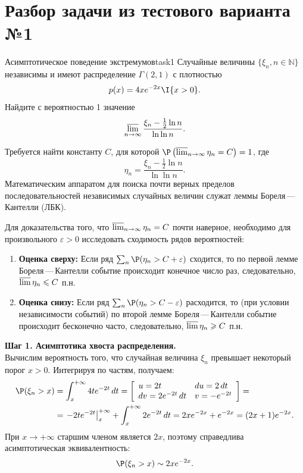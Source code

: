 \section*{Разбор задачи из тестового варианта №1}
\begin{Task}{Асимптотическое поведение экстремумов}{task1}
Случайные величины $\{\xi_n, n \in \mathbb{N}\}$ независимы и имеют распределение $\Gamma(2, 1)$ с плотностью
\[
p(x) = 4xe^{-2x}\I\{x > 0\}.
\]
Найдите с вероятностью 1 значение
\[
\varlimsup_{n \to \infty} \frac{\xi_n - \frac{1}{2}\ln n}{\ln \ln n}.
\]
\end{Task}

\begin{Solution}
Требуется найти константу $C$, для которой $\P\left(\varlimsup_{n\to\infty} \eta_n = C\right) = 1$, где 
\[
\eta_n = \frac{\xi_n - \frac{1}{2}\ln n}{\ln \ln n}.
\]
Математическим аппаратом для поиска почти верных пределов последовательностей независимых случайных величин служат леммы Бореля\,---\,Кантелли (ЛБК). 

\begin{MethodBox}
Для доказательства того, что $\varlimsup_{n\to\infty} \eta_n = C$ почти наверное, необходимо для произвольного $\varepsilon > 0$ исследовать сходимость рядов вероятностей:
\begin{enumerate}
    \item \textbf{Оценка сверху:} Если ряд $\sum_{n} \P(\eta_n > C + \varepsilon)$ сходится, то по первой лемме Бореля\,---\,Кантелли событие происходит конечное число раз, следовательно, $\varlimsup \eta_n \leqslant C$ п.н.
    \item \textbf{Оценка снизу:} Если ряд $\sum_{n} \P(\eta_n > C - \varepsilon)$ расходится, то (при условии независимости событий) по второй лемме Бореля\,---\,Кантелли событие происходит бесконечно часто, следовательно, $\varlimsup \eta_n \geqslant C$ п.н.
\end{enumerate}
\end{MethodBox}

\textbf{Шаг 1. Асимптотика хвоста распределения.} \\
Вычислим вероятность того, что случайная величина $\xi_n$ превышает некоторый порог $x > 0$. Интегрируя по частям, получаем:
\begin{align*}
\P(\xi_n > x) &= \int_{x}^{+\infty} 4t e^{-2t} \, dt = \left[ \begin{array}{ll} 
u = 2t & du = 2\,dt \\ 
dv = 2e^{-2t}\,dt & v = -e^{-2t} \end{array} \right] = \\
&= \left. -2t e^{-2t} \right|_{x}^{+\infty} + \int_{x}^{+\infty} 2e^{-2t} \, dt = 2xe^{-2x} + e^{-2x} = (2x + 1)e^{-2x}.
\end{align*}
При $x \to +\infty$ старшим членом является $2x$, поэтому справедлива асимптотическая эквивалентность:
\[
\P(\xi_n > x) \sim 2x e^{-2x}.
\]


\end{Solution}
